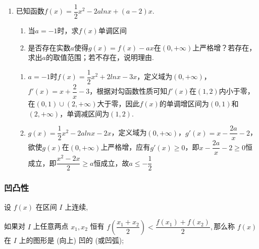 \begin{enumerate}
\begin{jieda}
\begin{enumerate}
        \end{enumerate}
    \end{jieda}
    \item 已知函数$f(x) = \dfrac{1}{2}x^2-2alnx+(a-2)x$.
    \begin{enumerate}
        \item 当$a = -1$时，求$f(x)$单调区间
        \item 是否存在实数$a$使得$g(x) = f(x) - ax$在$(0, +\infty)$上严格增？若存在，求出$a$的取值范围；若不存在，说明理由.
    \end{enumerate}
    \begin{jieda}
        \begin{enumerate}
            \item $a = -1$时$f(x) = \dfrac{1}{2}x^2+2lnx-3x$，定义域为$(0, +\infty)$，$f'(x) = x+\dfrac{2}{x}-3$，根据对勾函数性质可知$f'(x)$在$(1, 2)$内小于零，在$(0, 1) \cup (2, +\infty)$大于零，因此$f(x)$的单调增区间为$(0, 1)$和$(2, +\infty)$，单调减区间为$(1, 2)$.
            \item $g(x) = \dfrac{1}{2}x^2-2alnx-2x$，定义域为$(0, +\infty)$，$g'(x) = x - \dfrac{2a}{x} - 2$，欲使$g(x)$在$(0, +\infty)$上严格增，应有$g'(x) \geq 0$，即$x - \dfrac{2a}{x} - 2 \geq 0$恒成立，即$\dfrac{x^2-2x}{2} \geq a$恒成立，故$a \leq -\dfrac{1}{2}$
        \end{enumerate}
    \end{jieda}
\end{enumerate}
\subsubsection*{凹凸性}
设 $f\left( x\right)$ 在区间 $I$ 上连续,

如果对 $I$ 上任意两点 ${x}_{1},{x}_{2}$ 恒有
$f\left( \dfrac{{x}_{1} + {x}_{2}}{2}\right)  < \dfrac{f\left( {x}_{1}\right)  + f\left( {x}_{2}\right) }{2},$那么称 $f\left( x\right)$ 在 $I$ 上的图形是 (向上) 凹的 (或凹弧); 

